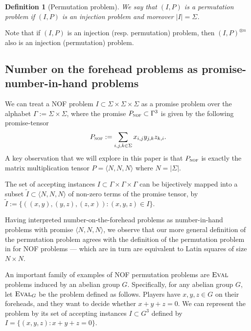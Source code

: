 \documentclass[10pt,a4paper]{article}
\newtheorem{definition}[theorem]{Definition}
\newcommand{\eval}{\textsc{Eval}}
\newcommand{\supp}{\mathrm{supp}}
\newcommand{\mmP}{P_{\textsc{nof}}}
\newcommand{\inprod}[1]{\langle #1 \rangle}
\begin{document}
\begin{definition}[Permutation problem]
    We say that $(I, P)$ is a permutation problem if $(I, P)$ is an injection problem and moreover $|I| = \Sigma$.
\end{definition}

Note that if $(I, P)$ is an injection (resp. permutation) problem, then $(I, P)^{\otimes n}$ also is an injection (permutation) problem.

\subsection{Number on the forehead problems as promise-number-in-hand problems}
We can treat a NOF problem $I \subset \Sigma \times \Sigma \times \Sigma$ as a promise problem over the alphabet $\Gamma := \Sigma \times \Sigma$, where the promise $\mmP \subset \Gamma^3$ is given by the following promise-tensor
\begin{equation*}
    \mmP := \sum_{i,j,k \in \Sigma} x_{i,j} y_{j,k} z_{k,i}.
\end{equation*}
A key observation that we will explore in this paper is that $\mmP$ is exactly the matrix multiplication tensor $P = \inprod{N,N,N}$ where $N = |\Sigma|$.

The set of accepting instances $I \subset \Gamma \times \Gamma \times \Gamma$ can be bijectively mapped into a subset $\tilde{I} \subset \inprod{N,N,N}$ of non-zero terms of the promise tensor, by $\tilde{I} := \{ ((x,y), (y,z), (z,x) ) : (x,y,z) \in I \}$.

Having interpreted number-on-the-forehead problems as number-in-hand problems with promise $\inprod{N,N,N}$, we observe that our more general definition of the permutation problem agrees with the definition of the permutation problem in \cite{LPS17} for NOF problems --- which are in turn are equivalent to Latin squares of size $N \times N$.

An important family of examples of NOF permutation problems are $\eval$ problems induced by an abelian group $G$. Specifically, for any abelian group $G$, let $\eval_G$ be the problem defined as follows. Players have $x,y,z \in G$ on their foreheads, and they want to decide whether $x+y+z = 0$. We can represent the problem by its set of accepting instances $I \subset G^3$ defined by $I = \{(x,y,z) : x+y+z = 0\}$. %
\end{document}
